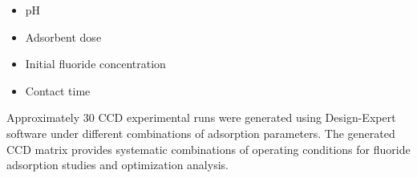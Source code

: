\begin{itemize}
	\item pH
	\item Adsorbent dose
	\item Initial fluoride concentration
	\item Contact time
\end{itemize}
Approximately 30 CCD experimental runs were generated using Design-Expert software under different combinations of adsorption parameters. The generated CCD matrix provides systematic combinations of operating conditions for fluoride adsorption studies and optimization analysis. 
\begin{table}[H]
	\centering
	\caption{CCD experimental runs and fluoride removal response}
	\label{tab:ccd_results}
	\renewcommand{\arraystretch}{1.2}
	
\end{table}
